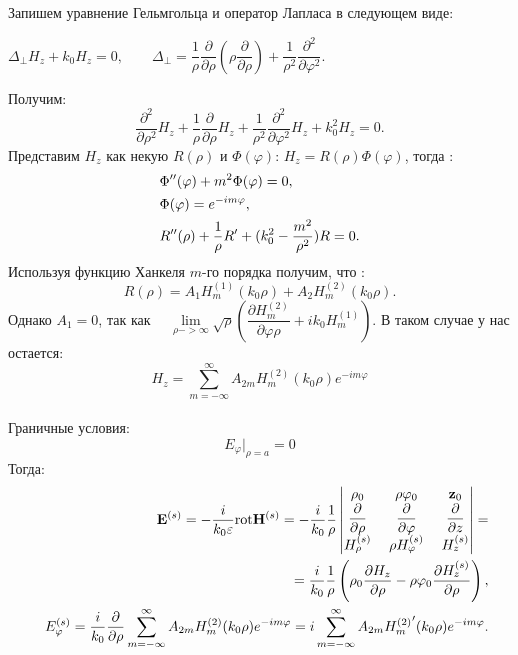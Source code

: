 Запишем уравнение Гельмгольца и оператор Лапласа в следующем виде:
\begin{center}
	$ 
	\Delta_{\perp}H_{z} + k_{0}H_{z} = 0, \qquad
	\Delta_{\perp} = \dfrac{1}{\rho}
	\dfrac{\partial}{\partial \rho} 
	\left(\rho \dfrac{\partial}{\partial \rho}\right) + 
	\dfrac{1}{\rho^{2}}
	\dfrac{\partial^{2}}{\partial \varphi^{2}} .
	$
\end{center}
Получим:
\begin{equation}
	\dfrac{\partial^{2}}{\partial \rho^{2}}H_{z}  +
\dfrac{1}{\rho}\dfrac{\partial}{\partial \rho}H_{z} +
\dfrac{1}{\rho^{2}}\dfrac{\partial^{2}}{\partial \varphi^{2}}H_{z}+
k_{0}^{2}H_{z} = 0.
\end{equation}
Представим $ H_{z} $ как некую $ R(\rho) $ и $ \Phi(\varphi) $:\quad
$ H_{z} = R(\rho)\Phi(\varphi) $, \qquad тогда :
\begin{align}
&\Phi^{\prime\prime}(\varphi) + m^2\Phi(\varphi) = 0,\notag\\ 
&\Phi(\varphi) = e^{-im\varphi},\notag\\
&R^{\prime\prime}(\rho) + \dfrac{1}{\rho} R^{\prime} + (k_{0}^{2} - \dfrac{m^{2}}{\rho^{2}})R = 0.
\end{align}
Используя функцию Ханкеля $m$-го порядка получим, что :
\begin{equation}
	R(\rho) = A_{1}H_{m}^{(1)}(k_{0}\rho) + A_{2}H_{m}^{(2)}(k_{0}\rho).
\end{equation}
Однако  $ A_{1} = 0 $, так как
$\quad \lim\limits_{\rho -> \infty}\sqrt{\rho}
(\dfrac{\partial H_{m}^{(2)}}{\partial \varphi \rho} + ik_{0}H_{m}^{(1)} ).
$ 
В таком случае у нас остается:
$$
H_{z} = \sum_{m=-\infty}^{\infty}A_{2m}H_{m}^{(2)}(k_{0}\rho)e^{-im\varphi}
$$
\\
Граничные условия:
\begin{equation}
	E_{\varphi}|_{\rho=a} = 0
\end{equation}
Тогда:
\begin{eqnarray}
&&\vec{E}^{(s)} = - \dfrac{i}{k_{0}\varepsilon} {\rm rot}\vec{H}^{(s)} = - \dfrac{i}{k_{0}} \dfrac{1}{\rho}
\begin{vmatrix}
\vec{\rho}_{0}& \;\rho \vec{\varphi}_{0}& \; \vec{z}_{0} \\
\dfrac{\partial }{\partial \rho}& \; 
\dfrac{\partial }{\partial \varphi}&\; 
\dfrac{\partial }{\partial z} \\
H_{\rho}^{(s)}&\; \rho H_{\varphi}^{(s)}&\; H_{z}^{(s)}
\end{vmatrix}
=\notag\\
&& = \dfrac{i}{k_{0}} \dfrac{1}{\rho}\left(\vec{\rho}_{0}
\dfrac{\partial H_{z}}{\partial \rho} - \rho\vec{\varphi}_{0}
\dfrac{\partial H_{z}^{(s)}}{\partial \rho}\right),
\\
&&E_{\varphi}^{(s)} = \dfrac{i}{k_{0}}
\dfrac{\partial }{\partial \rho} \sum_{m=-\infty}^{\infty} A_{2m}H_{m}^{(2)}(k_{0}\rho)e^{-im\varphi} = i\sum_{m=-\infty}^{\infty}A_{2m}{H_{m}^{(2)}}^{\prime}(k_{0}\rho)e^{-im\varphi}.
\end{eqnarray}

